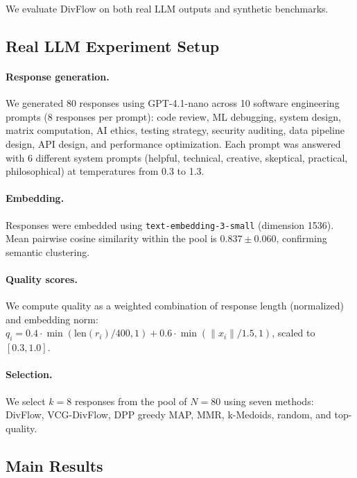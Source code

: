 \documentclass[10pt]{article}
\begin{document}
We evaluate DivFlow on both real LLM outputs and synthetic benchmarks.

\subsection{Real LLM Experiment Setup}
\label{sec:real-setup}

\paragraph{Response generation.}
We generated 80 responses using GPT-4.1-nano across 10 software engineering prompts (8 responses per prompt): code review, ML debugging, system design, matrix computation, AI ethics, testing strategy, security auditing, data pipeline design, API design, and performance optimization.
Each prompt was answered with 6 different system prompts (helpful, technical, creative, skeptical, practical, philosophical) at temperatures from 0.3 to 1.3.

\paragraph{Embedding.}
Responses were embedded using \texttt{text-embedding-3-small} (dimension 1536).
Mean pairwise cosine similarity within the pool is $0.837 \pm 0.060$, confirming semantic clustering.

\paragraph{Quality scores.}
We compute quality as a weighted combination of response length (normalized) and embedding norm: $q_i = 0.4 \cdot \min(\text{len}(r_i)/400, 1) + 0.6 \cdot \min(\|x_i\|/1.5, 1)$, scaled to $[0.3, 1.0]$.

\paragraph{Selection.}
We select $k=8$ responses from the pool of $N=80$ using seven methods: DivFlow, VCG-DivFlow, DPP greedy MAP, MMR, k-Medoids, random, and top-quality.

\subsection{Main Results}
\label{sec:main-results}
\end{document}
